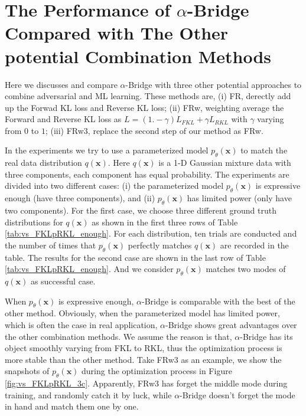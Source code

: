 \documentclass[letterpaper]{article} %
\newcommand{\xv}[0]{\ensuremath{\boldsymbol{x}} }
\begin{document}
\section{The Performance of $\alpha$-Bridge Compared with The Other potential Combination Methods}
\label{sec:vs_FKLpRKL}
Here we discusses and compare $\alpha$-Bridge with three other potential approaches to combine adversarial and ML learning. These methods are, 
(i) FR, derectly add up the Forwad KL loss and Reverse KL loss;
(ii) FRw, weighting average the Forward and Reverse KL loss as $L = (1. - \gamma) L_{FKL} + \gamma L_{RKL}$ with $\gamma$ varying from $0$ to $1$;
(iii) FRw3, replace the second step of our method as FRw.

In the experiments we try to use a parameterized model $p_{\theta}(\xv)$ to match the real data distribution $q(\xv)$. Here $q(\xv)$ is a 1-D Gaussian mixture data with three components, each component has equal probability. The experiments are divided into two different cases: (i) the parameterized model $p_{\theta}(\xv)$ is expressive enough (have three components), and (ii) $p_{\theta}(\xv)$ has limited power (only have two components). For the first case, we choose three different ground truth distributions for $q(\xv)$ as shown in the first three rows of Table \ref{tab:vs_FKLpRKL_enough}. For each distribution, ten trials are conducted and the number of times that $p_{\theta}(\xv)$ perfectly matches $q(\xv)$ are recorded in the table. 
The results for the second case are shown in the last row of Table \ref{tab:vs_FKLpRKL_enough}. And we consider $p_{\theta}(\xv)$ matches two modes of $q(\xv)$ as successful case.


When $p_{\theta}(\xv)$ is expressive enough, $\alpha$-Bridge is comparable with the best of the other method.
Obviously, when the parameterized model has limited power, which is often the case in real application, $\alpha$-Bridge shows great advantages over the other combination methods. 
We assume the reason is that,  $\alpha$-Bridge has its object smoothly varying from FKL to RKL, thus the optimization process is more stable than the other method. Take FRw3 as an example, we show the snapshots of $p_{\theta}(\xv)$ during the optimization process in Figure \ref{fig:vs_FKLpRKL_3c}. Apparently, FRw3 has forget the middle mode during training, and randomly catch it by luck, while $\alpha$-Bridge doesn't forget the mode in hand and match them one by one.
\end{document}
